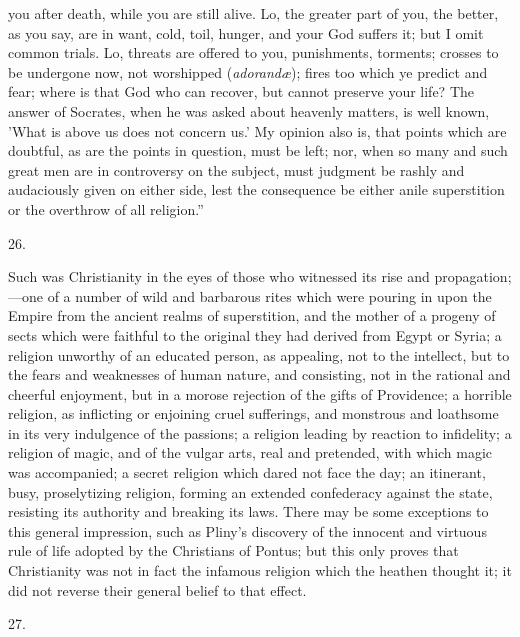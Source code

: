 you after death, while you are still alive. Lo, the
greater part of you, the better, as you say, are in want,
cold, toil, hunger, and your God suffers it; but I omit
common trials. Lo, threats are offered to you,
punishments, torments; crosses to be undergone now, not
worshipped (\emph{adorandæ}); fires too which ye predict
and fear; where is that God who can recover, but cannot
preserve your life? The answer of Socrates, when he was
asked about heavenly matters, is well known, 'What is
above us does not concern us.' My opinion also is, that
points which are doubtful, as are the points in question,
must be left; nor, when so many and such great men are in
controversy on the subject, must judgment be rashly and
audaciously given on either side, lest the consequence be
either anile superstition or the overthrow of all
religion.''

26.

Such was Christianity in the eyes of those who
witnessed its rise and propagation;—one of a number
of wild and barbarous rites which were pouring in upon
the Empire from the ancient realms of superstition, and
the mother of a progeny of sects which were faithful to
the original they had derived from Egypt or Syria; a
religion unworthy of an educated person, as appealing,
not to the intellect, but to the fears and weaknesses of
human nature, and consisting, not in the rational and
cheerful enjoyment, but in a morose rejection of the
gifts of Providence; a horrible religion, as inflicting
or enjoining cruel sufferings, and monstrous and
loathsome in its very indulgence of the passions; a
religion leading by reaction to infidelity; a religion of
magic, and of the vulgar arts, real and pretended, with
which magic was accompanied; a secret religion which
dared not face the day; an itinerant, busy, proselytizing
religion, forming an extended confederacy against the
state, resisting its authority and breaking its laws.
There may be some exceptions to this general impression,
such as Pliny's discovery of the innocent and virtuous
rule of life adopted by the Christians of Pontus; but
this only proves that Christianity was not in fact the
infamous religion which the heathen thought it; it did
not reverse their general belief to that effect.

27.

